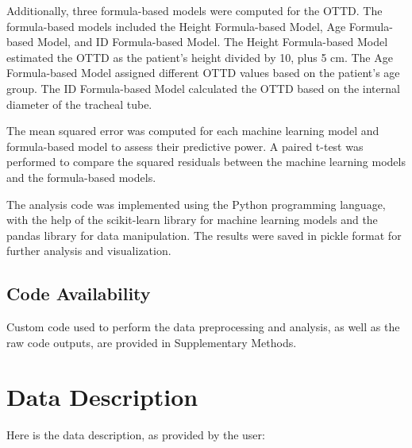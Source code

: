 \documentclass[11pt]{article}
\begin{document}
Additionally, three formula-based models were computed for the OTTD. The formula-based models included the Height Formula-based Model, Age Formula-based Model, and ID Formula-based Model. The Height Formula-based Model estimated the OTTD as the patient's height divided by 10, plus 5 cm. The Age Formula-based Model assigned different OTTD values based on the patient's age group. The ID Formula-based Model calculated the OTTD based on the internal diameter of the tracheal tube.

The mean squared error was computed for each machine learning model and formula-based model to assess their predictive power. A paired t-test was performed to compare the squared residuals between the machine learning models and the formula-based models.

The analysis code was implemented using the Python programming language, with the help of the scikit-learn library for machine learning models and the pandas library for data manipulation. The results were saved in pickle format for further analysis and visualization.\subsection*{Code Availability}

Custom code used to perform the data preprocessing and analysis, as well as the raw code outputs, are provided in Supplementary Methods.


\clearpage
\appendix

\section{Data Description} \label{sec:data_description} Here is the data description, as provided by the user:
\end{document}
